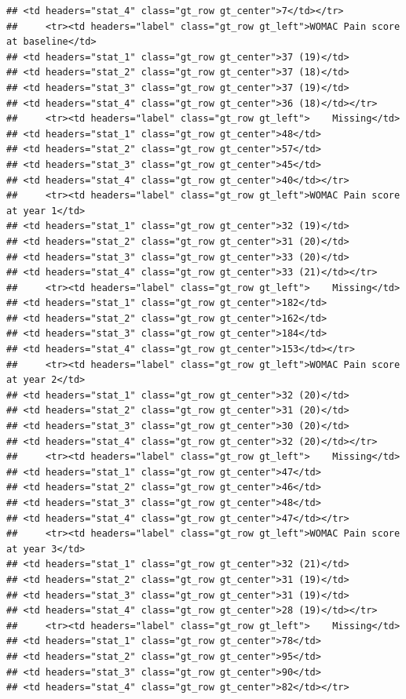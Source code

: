 \documentclass{article}
\begin{document}
\begin{verbatim}
## <td headers="stat_4" class="gt_row gt_center">7</td></tr>
##     <tr><td headers="label" class="gt_row gt_left">WOMAC Pain score at baseline</td>
## <td headers="stat_1" class="gt_row gt_center">37 (19)</td>
## <td headers="stat_2" class="gt_row gt_center">37 (18)</td>
## <td headers="stat_3" class="gt_row gt_center">37 (19)</td>
## <td headers="stat_4" class="gt_row gt_center">36 (18)</td></tr>
##     <tr><td headers="label" class="gt_row gt_left">    Missing</td>
## <td headers="stat_1" class="gt_row gt_center">48</td>
## <td headers="stat_2" class="gt_row gt_center">57</td>
## <td headers="stat_3" class="gt_row gt_center">45</td>
## <td headers="stat_4" class="gt_row gt_center">40</td></tr>
##     <tr><td headers="label" class="gt_row gt_left">WOMAC Pain score at year 1</td>
## <td headers="stat_1" class="gt_row gt_center">32 (19)</td>
## <td headers="stat_2" class="gt_row gt_center">31 (20)</td>
## <td headers="stat_3" class="gt_row gt_center">33 (20)</td>
## <td headers="stat_4" class="gt_row gt_center">33 (21)</td></tr>
##     <tr><td headers="label" class="gt_row gt_left">    Missing</td>
## <td headers="stat_1" class="gt_row gt_center">182</td>
## <td headers="stat_2" class="gt_row gt_center">162</td>
## <td headers="stat_3" class="gt_row gt_center">184</td>
## <td headers="stat_4" class="gt_row gt_center">153</td></tr>
##     <tr><td headers="label" class="gt_row gt_left">WOMAC Pain score at year 2</td>
## <td headers="stat_1" class="gt_row gt_center">32 (20)</td>
## <td headers="stat_2" class="gt_row gt_center">31 (20)</td>
## <td headers="stat_3" class="gt_row gt_center">30 (20)</td>
## <td headers="stat_4" class="gt_row gt_center">32 (20)</td></tr>
##     <tr><td headers="label" class="gt_row gt_left">    Missing</td>
## <td headers="stat_1" class="gt_row gt_center">47</td>
## <td headers="stat_2" class="gt_row gt_center">46</td>
## <td headers="stat_3" class="gt_row gt_center">48</td>
## <td headers="stat_4" class="gt_row gt_center">47</td></tr>
##     <tr><td headers="label" class="gt_row gt_left">WOMAC Pain score at year 3</td>
## <td headers="stat_1" class="gt_row gt_center">32 (21)</td>
## <td headers="stat_2" class="gt_row gt_center">31 (19)</td>
## <td headers="stat_3" class="gt_row gt_center">31 (19)</td>
## <td headers="stat_4" class="gt_row gt_center">28 (19)</td></tr>
##     <tr><td headers="label" class="gt_row gt_left">    Missing</td>
## <td headers="stat_1" class="gt_row gt_center">78</td>
## <td headers="stat_2" class="gt_row gt_center">95</td>
## <td headers="stat_3" class="gt_row gt_center">90</td>
## <td headers="stat_4" class="gt_row gt_center">82</td></tr>

\end{verbatim}
\end{document}
